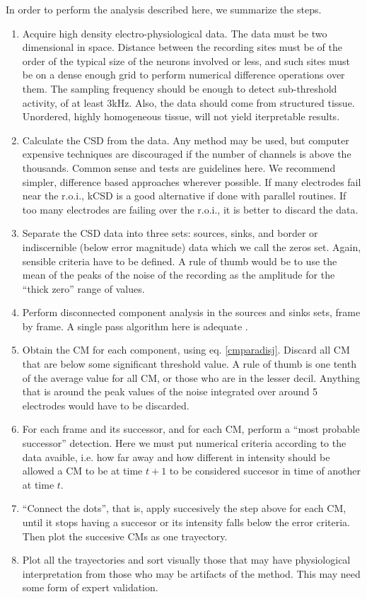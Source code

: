 \documentclass[12pt]{article}
\begin{document}
 In order to perform the analysis described here, we summarize the steps.
 \begin{enumerate}
 \item Acquire high density electro-physiological data. The data must be two
   dimensional
   in space. Distance between the recording sites must be of the order of the typical
   size of the neurons involved or less, and such sites must be on a dense enough grid to perform numerical difference operations over them.
   The sampling frequency should be enough to detect sub-threshold activity,
   of at least 3kHz. Also, the data should come from structured tissue.
   Unordered, highly homogeneous tissue, will not yield iterpretable results. 
 \item Calculate the CSD from the data. Any method may be used,
   but computer expensive techniques are discouraged if the
   number of channels is above the thousands.
   Common sense and tests are guidelines here.
   We recommend simpler, difference based approaches wherever possible.
   If many electrodes fail near the r.o.i.,
   kCSD is a good alternative if done with
   parallel routines.
   If too many electrodes are failing over the r.o.i.,
   it is better to discard the data. 
 \item Separate the CSD data into three sets: sources, sinks, and border or indiscernible (below error magnitude) data
   which we call the zeros set. Again, sensible criteria have to be defined.
   A rule of thumb would be to use the mean of the peaks of the noise  of the recording as the amplitude for the ``thick zero'' range of values. 
\item Perform disconnected component analysis in the sources and sinks sets, frame by frame.
  A single pass algorithm here is  adequate \cite{Vincent91, Abubaker07}.
\item  Obtain the CM for each component, using eq. \ref{cmparadisj}. Discard
  all CM that are below some significant threshold value. A rule of thumb is one tenth of the average value for all CM,
  or those who are in the lesser decil. Anything that is around the peak
  values of the noise integrated over around 5 electrodes would have to be discarded.
\item For each frame and its successor, and for each CM, perform a ``most probable successor'' detection. Here we must put numerical criteria according to the data avaible, i.e. how far away and how different in intensity should be allowed a CM to be at time $t+1$ to be considered succesor in time of another at time $t$.
\item ``Connect the dots'', that is, apply succesively the step above for each CM, until it stops having a succesor or its intensity falls below the error criteria. Then plot the succesive CMs as one trayectory.
\item Plot all the trayectories and sort visually those that may have physiological interpretation from those who may be artifacts of the method. This may need some form of expert validation.
 \end{enumerate}
 
\end{document}
